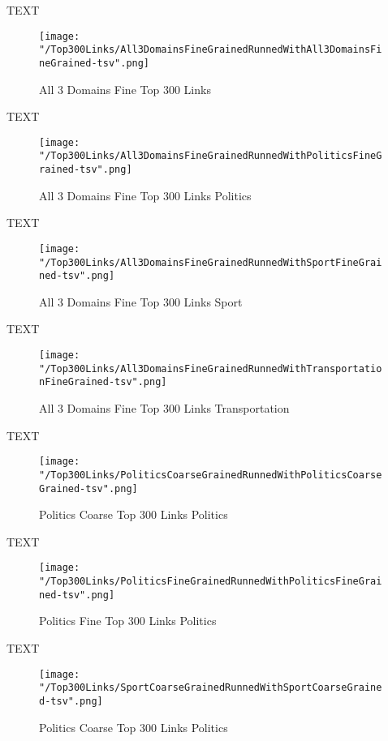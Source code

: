 \documentclass[thesis=M,english]{FITthesis}[2018/05/30]
\begin{document}
		TEXT	

	\begin{figure}[H]\centering
		\texttt{[image: "/Top300Links/All3DomainsFineGrainedRunnedWithAll3DomainsFineGrained-tsv".png]}
		\caption{All 3 Domains Fine Top 300 Links }\label{}	
	\end{figure}
	
	TEXT

	\begin{figure}[H]\centering
		\texttt{[image: "/Top300Links/All3DomainsFineGrainedRunnedWithPoliticsFineGrained-tsv".png]}
		\caption{All 3 Domains Fine Top 300 Links Politics}\label{}
	\end{figure}	

	TEXT	

	\begin{figure}[H]\centering
		\texttt{[image: "/Top300Links/All3DomainsFineGrainedRunnedWithSportFineGrained-tsv".png]}
		\caption{All 3 Domains Fine Top 300 Links Sport}\label{}
	\end{figure}
	
		TEXT	

	\begin{figure}[H]\centering
		\texttt{[image: "/Top300Links/All3DomainsFineGrainedRunnedWithTransportationFineGrained-tsv".png]}
		\caption{All 3 Domains Fine Top 300 Links Transportation}\label{}	
	\end{figure}
	
	TEXT

	\begin{figure}[H]\centering
		\texttt{[image: "/Top300Links/PoliticsCoarseGrainedRunnedWithPoliticsCoarseGrained-tsv".png]}
		\caption{Politics Coarse Top 300 Links Politics}\label{}
	\end{figure}	

	TEXT	

	\begin{figure}[H]\centering
		\texttt{[image: "/Top300Links/PoliticsFineGrainedRunnedWithPoliticsFineGrained-tsv".png]}
		\caption{Politics Fine Top 300 Links Politics}\label{}
	\end{figure}

	
	TEXT

	\begin{figure}[H]\centering
		\texttt{[image: "/Top300Links/SportCoarseGrainedRunnedWithSportCoarseGrained-tsv".png]}
		\caption{Politics Coarse Top 300 Links Politics}\label{}
	\end{figure}		
	
\end{document}
